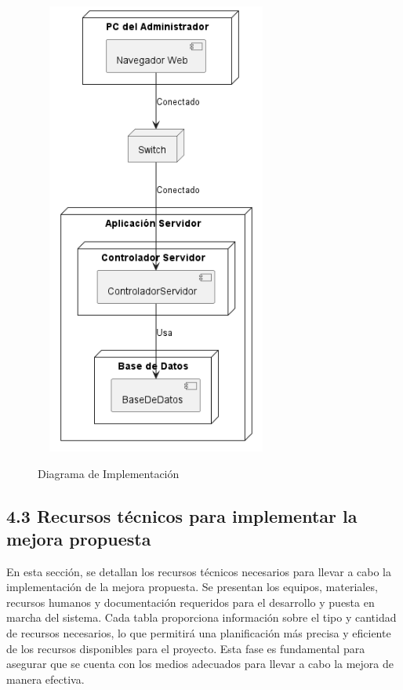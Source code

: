     \begin{figure}[H]
    \centering
    \caption[Diagrama de Implementación]{Diagrama de Implementación}
    \includegraphics[width=8cm, height=15cm]{imagenes/cap4/diagramaImplementacion.png}
    \label{fig:DIMplementacion}
    \end{figure}


\subsection{4.3 Recursos técnicos para implementar la mejora propuesta}
En esta sección, se detallan los recursos técnicos necesarios para llevar a cabo la implementación de la mejora propuesta. Se presentan los equipos, materiales, recursos humanos y documentación requeridos para el desarrollo y puesta en marcha del sistema. Cada tabla proporciona información sobre el tipo y cantidad de recursos necesarios, lo que permitirá una planificación más precisa y eficiente de los recursos disponibles para el proyecto. Esta fase es fundamental para asegurar que se cuenta con los medios adecuados para llevar a cabo la mejora de manera efectiva.

